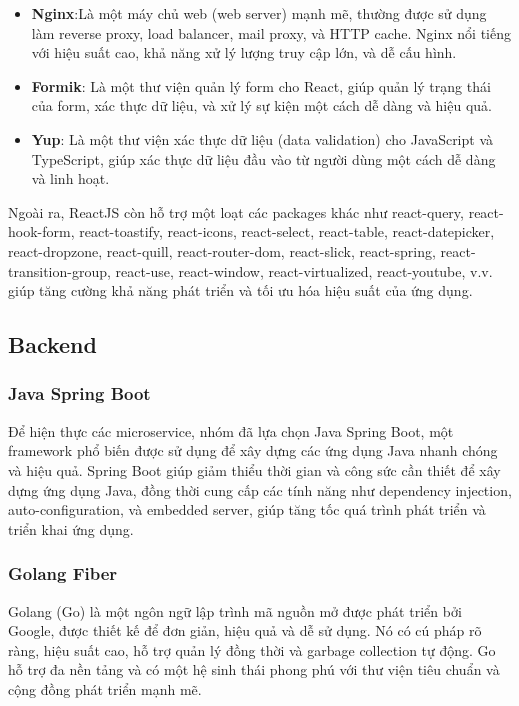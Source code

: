 \begin{itemize}
    \item \textbf{Nginx}:Là một máy chủ web (web server) mạnh mẽ, thường được sử dụng làm reverse proxy, load balancer, mail proxy, và HTTP cache. Nginx nổi tiếng với hiệu suất cao, khả năng xử lý lượng truy cập lớn, và dễ cấu hình.
    \item \textbf{Formik}: Là một thư viện quản lý form cho React, giúp quản lý trạng thái của form, xác thực dữ liệu, và xử lý sự kiện một cách dễ dàng và hiệu quả.
    \item \textbf{Yup}: Là một thư viện xác thực dữ liệu (data validation) cho JavaScript và TypeScript, giúp xác thực dữ liệu đầu vào từ người dùng một cách dễ dàng và linh hoạt.
\end{itemize}
\noindent Ngoài ra, ReactJS còn hỗ trợ một loạt các packages khác như react-query, react-hook-form, react-toastify, react-icons, react-select, react-table, react-datepicker, react-dropzone, react-quill, react-router-dom, react-slick, react-spring, react-transition-group, react-use, react-window, react-virtualized, react-youtube, v.v. giúp tăng cường khả năng phát triển và tối ưu hóa hiệu suất của ứng dụng.
\subsection{Backend}
\subsubsection{Java Spring Boot}
\noindent Để hiện thực các microservice, nhóm đã lựa chọn Java Spring Boot, một framework phổ biến được sử dụng để xây dựng các ứng dụng Java nhanh chóng và hiệu quả. Spring Boot giúp giảm thiểu thời gian và công sức cần thiết để xây dựng ứng dụng Java, đồng thời cung cấp các tính năng như dependency injection, auto-configuration, và embedded server, giúp tăng tốc quá trình phát triển và triển khai ứng dụng.

\subsubsection{Golang Fiber}
\noindent Golang (Go) là một ngôn ngữ lập trình mã nguồn mở được phát triển bởi Google, được thiết kế để đơn giản, hiệu quả và dễ sử dụng. Nó có cú pháp rõ ràng, hiệu suất cao, hỗ trợ quản lý đồng thời và garbage collection tự động. Go hỗ trợ đa nền tảng và có một hệ sinh thái phong phú với thư viện tiêu chuẩn và cộng đồng phát triển mạnh mẽ.\\[0.5cm]


